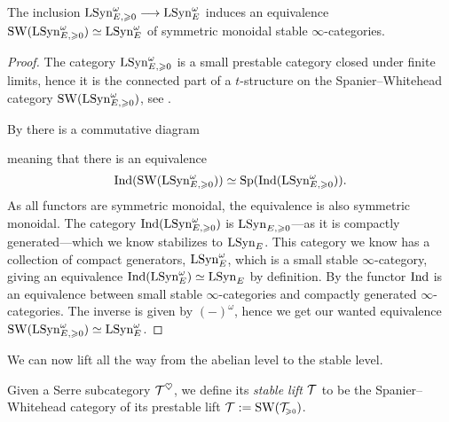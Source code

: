 \begin{theorem}
    \label{ch3:add:thm:prestable-freyd-stabilizes-to-stable-Freyd}
    The inclusion $\mathrm{LSyn}_{E, \geqslant 0}^\omega \longrightarrow \mathrm{LSyn}_{E}^\omega$ induces an equivalence $\operatorname{SW}(\mathrm{LSyn}_{E, \geqslant 0}^\omega)\simeq \mathrm{LSyn}_{E}^\omega$ of symmetric monoidal stable $\infty$-categories. 
\end{theorem}
\begin{proof}
    The category $\mathrm{LSyn}_{E, \geqslant 0}^\omega$ is a small prestable category closed under finite limits, hence it is the connected part of a $t$-structure on the Spanier--Whitehead category $\operatorname{SW}(\mathrm{LSyn}_{E, \geqslant 0}^\omega)$, see \cite[C.1.1, C.1.2]{lurie_SAG}. 

    By \cite[C.1.1.6]{lurie_SAG} there is a commutative diagram
    \begin{center}
    \end{center}
    meaning that there is an equivalence
    \[\operatorname{Ind}(\operatorname{SW}(\mathrm{LSyn}_{E, \geqslant 0}^\omega))\simeq \mathrm{Sp}(\operatorname{Ind}(\mathrm{LSyn}_{E, \geqslant 0}^\omega)).\]
    As all functors are symmetric monoidal, the equivalence is also symmetric monoidal. The category $\operatorname{Ind}(\mathrm{LSyn}_{E, \geqslant 0}^\omega)$ is $\mathrm{LSyn}_{E, \geqslant 0}$---as it is compactly generated---which we know stabilizes to $\mathrm{LSyn}_{E}$. This category we know has a collection of compact generators, $\mathrm{LSyn}_{E}^\omega$, which is a small stable $\infty$-category, giving an equivalence $\operatorname{Ind}(\mathrm{LSyn}_{E}^\omega)\simeq \mathrm{LSyn}_{E}$ by definition. By \cite[5.3.2.11(3)]{Lurie_HA} the functor $\operatorname{Ind}$ is an equivalence between small stable $\infty$-categories and compactly generated $\infty$-categories. The inverse is given by $(-)^\omega$, hence we get our wanted equivalence $\operatorname{SW}(\mathrm{LSyn}_{E, \geqslant 0}^\omega)\simeq \mathrm{LSyn}_{E}^\omega$. 
\end{proof}

We can now lift all the way from the abelian level to the stable level. 

\begin{definition}
    Given a Serre subcategory $\mathcal{T}^\heartsuit$, we define its \emph{stable lift} $\mathcal{T}$ to be the Spanier--Whitehead category of its prestable lift $\mathcal{T}:= \operatorname{SW}(\mathcal{T}_{\hspace{-1pt}\scriptscriptstyle\geqslant 0})$. 
\end{definition}


